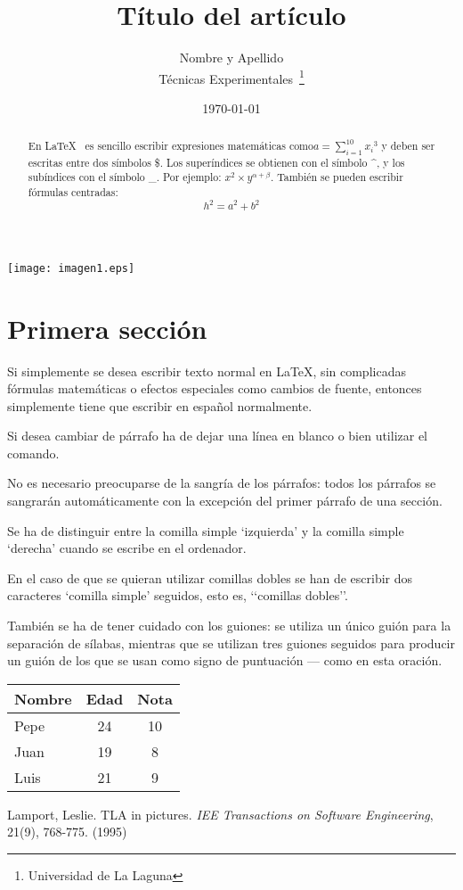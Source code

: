 \documentclass[a4paper,12pt]{article}
\begin{document}
\texttt{[image: imagen1.eps]}
\title{Título del artículo}
\author{Nombre y Apellido \\
        Técnicas Experimentales~\footnote{Universidad de La Laguna}
        }
\date{\today}
\maketitle
\begin{abstract}
   En \LaTeX{}~\cite{Lam:86} es sencillo escribir expresiones
   matemáticas como$a=\sum_{i=1}^{10} {x_i}^{3}$
   y deben ser escritas entre dos símbolos \$.
   Los superíndices se obtienen con el símbolo \^{}, y
   los subíndices con el símbolo \_.
   Por ejemplo: $x^2 \times y^{\alpha + \beta}$.
   También se pueden escribir fórmulas centradas:
   \[h^2=a^2 + b^2\]
\end{abstract}

\section{Primera sección}
Si simplemente se desea escribir texto normal en LaTeX,
sin complicadas f\'ormulas matem\'aticas o efectos especiales
como cambios de fuente, entonces simplemente tiene que escribir
en espa\~nol normalmente.\par
Si desea cambiar de  párrafo ha de dejar una  línea en blanco o bien
utilizar el comando. \par
No es necesario preocuparse de la sangría de los párrafos:
todos los párrafos se sangrarán automáticamente con la excepción
del primer párrafo de una sección.\par
Se ha de distinguir entre la comilla simple ‘izquierda’
y la comilla simple ‘derecha’ cuando se escribe en el ordenador.\par
En el caso de que se quieran utilizar comillas dobles se han de
escribir dos caracteres ‘comilla simple’ seguidos, esto es,
‘‘comillas dobles’’.\par
También se ha de tener cuidado con los guiones: se utiliza un único
guión para la separación de sílabas, mientras que se utilizan
tres guiones seguidos para producir un guión de los que se usan
como signo de puntuación --- como en esta oración.
\bigskip
\begin{tabular}{|l|c|c|}
\hline
Nombre & Edad & Nota \\ \hline
Pepe & 24 & 10 \\ \hline
Juan & 19 & 8 \\ \hline
Luis & 21 & 9 \\ \hline
\end{tabular}
\begin{thebibliography}{00}
    Lamport, Leslie.
    TLA in pictures.
    \emph{IEE Transactions on Software Engineering},
    21(9), 768-775.
    (1995)
\end{thebibliography}
\end{document}
